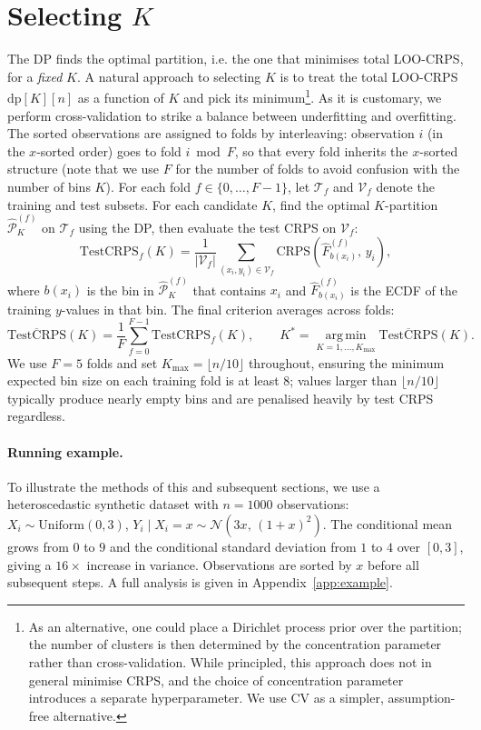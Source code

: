 \documentclass[11pt]{article}
\begin{document}
\section{Selecting \texorpdfstring{$K$}{K}}
\label{sec:K}

The DP finds the optimal partition, i.e. the one that minimises total LOO-CRPS, for a \emph{fixed} $K$.
A natural approach to selecting $K$ is to treat the total LOO-CRPS $\mathrm{dp}[K][n]$
as a function of $K$ and pick its minimum\footnote{
As an alternative, one could place a Dirichlet process prior over the partition; the number of clusters
is then determined by the concentration parameter rather than cross-validation.
While principled, this approach does not in general minimise CRPS, and the choice
of concentration parameter introduces a separate hyperparameter.
We use CV as a simpler, assumption-free alternative.}. 
As it is customary, we perform cross-validation to strike a balance between underfitting and overfitting.
The sorted observations are assigned to folds by interleaving:
observation $i$ (in the $x$-sorted order) goes to fold $i \bmod F$,
so that every fold inherits the $x$-sorted structure (note that we use $F$ for the number of folds to avoid
confusion with the number of bins $K$).
For each fold $f \in \{0,\ldots,F-1\}$, let $\mathcal{T}_f$ and
$\mathcal{V}_f$ denote the training and test subsets.
For each candidate $K$, find the optimal $K$-partition $\hat{\mathcal{P}}_K^{(f)}$
on $\mathcal{T}_f$ using the DP, then evaluate the test CRPS on $\mathcal{V}_f$:
\[
  \mathrm{TestCRPS}_f(K)
  = \frac{1}{|\mathcal{V}_f|}
    \sum_{(x_i, y_i) \in \mathcal{V}_f}
    \mathrm{CRPS}\!\left(\hat{F}_{b(x_i)}^{(f)},\, y_i\right),
\]
where $b(x_i)$ is the bin in $\hat{\mathcal{P}}_K^{(f)}$ that contains $x_i$ and
$\hat{F}_{b(x_i)}^{(f)}$ is the ECDF of the training $y$-values in that bin.
The final criterion averages across folds:
\[
  \overline{\mathrm{TestCRPS}}(K) = \frac{1}{F}\sum_{f=0}^{F-1} \mathrm{TestCRPS}_f(K),
  \qquad
  K^* = \operatorname*{arg\,min}_{K=1,\ldots,K_{\max}} \overline{\mathrm{TestCRPS}}(K).
\]
We use $F=5$ folds and set $K_{\max} = \lfloor n/10 \rfloor$ throughout,
ensuring the minimum expected bin size on each training fold is at least $8$;
values larger than $\lfloor n/10 \rfloor$ typically produce nearly empty bins
and are penalised heavily by test CRPS regardless.


\paragraph{Running example.}
To illustrate the methods of this and subsequent sections, we use a
heteroscedastic synthetic dataset with $n = 1000$ observations:
$X_i \sim \mathrm{Uniform}(0, 3)$,
$Y_i \mid X_i = x \sim \mathcal{N}(3x,\,(1+x)^2)$.
The conditional mean grows from $0$ to $9$ and the conditional standard deviation
from $1$ to $4$ over $[0,3]$, giving a $16\times$ increase in variance.
Observations are sorted by $x$ before all subsequent steps.
A full analysis is given in Appendix~\ref{app:example}.
\end{document}
